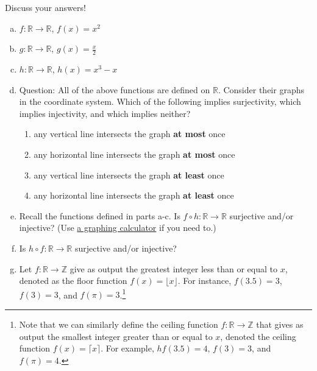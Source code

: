 \documentclass[12pt,letterpaper]{article}
\newcommand\Z{\mathbb Z}
\newcommand\R{\mathbb R}
\newif\ifsol
\newcommand{\solu}[2]{ \begin{mdframed} \ifsol #2 \else \vspace{#1} \fi \end{mdframed} }
\begin{document}
      Discuss your answers!
      \begin{enumerate}[a.]
      
		
		\item $f : \R \rightarrow \R$, $f(x) = x^2$

		\solu{1 cm}{Not injective or surjective.}	
		
		 \item $g : \R \rightarrow \R$, $g(x) = \frac{x}{2}$

		\solu{1cm}{Injective and surjective. Therefore bijective.}
		
        \item $h:\R\rightarrow \R$, $h(x)=x^3-x$
        
        \solu{1cm}{Surjective, but not injective}
        
         \item Question: All of the above functions are defined on $\R$. Consider their graphs in the coordinate system. Which of the following implies surjectivity, which implies injectivity, and which implies neither?
 \begin{enumerate}[(1)]
     \item any vertical line intersects the graph \textbf{at most} once
     \item any horizontal line intersects the graph \textbf{at most} once
      \item any vertical line intersects the graph \textbf{at least} once
     \item any horizontal line intersects the graph \textbf{at least}  once
 \end{enumerate}

\solu{2cm}{Surjection: (4).
Injection: (2). Neither: (1), (3)}

        \item Recall the functions defined in parts a-c. Is $f\circ h:\R\rightarrow \R$ surjective and/or injective? (Use \href{https://www.desmos.com/calculator}{\color{blue} a graphing calculator} if you need to.)
        
        \solu{1cm}{$f\circ h(x)= (x^3-x)^2$, not surjective,  not injective}
        
        \item Is $h\circ f: \R\rightarrow \R$ surjective and/or injective?
        
        \solu{1cm}{$h \circ f(x)= x^6 - x^2$, not surjective,  not injective}
        


        \item Let $f : \R \rightarrow \Z$
        give as output the greatest integer less than or equal to $x$, denoted as the floor function $f(x) = \lfloor x\rfloor$. For instance, $f(3.5)=3$, $f(3)=3$, and $f(\pi)=3$.\footnote{Note that we can similarly define the ceiling function $f : \R \rightarrow \Z$ that gives as output the smallest integer greater than or equal to $x$, denoted the ceiling function $f(x) = \lceil x \rceil $. For example, $hf(3.5)=4$, $f(3)=3$, and $f(\pi)=4$.}
        

\end{enumerate}
\end{document}
